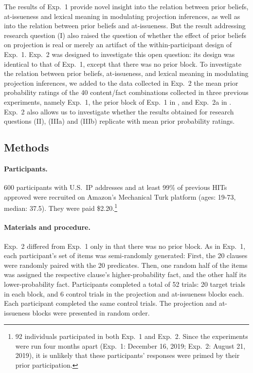 \documentclass[11pt,fleqn]{article}
\newcommand{\6}{\mbox{$[\hspace*{-.6mm}[$}}
\newcommand{\9}{\mbox{$]\hspace*{-.6mm}]$}}
\begin{document}
The results of Exp.~1 provide novel insight into the relation between prior beliefs, at-issueness and lexical meaning in modulating projection inferences, as well as into the relation between prior beliefs and at-issueness. But the result addressing research question (I) also raised the question of whether the effect of prior beliefs on projection is real or merely an artifact of the within-participant design of Exp.~1. Exp.~2 was designed to investigate this open question: its design was identical to that of Exp.~1, except that there was no prior block. To investigate the relation between prior beliefs, at-issueness, and lexical meaning in modulating projection inferences, we added to the data collected in Exp.~2 the mean prior probability ratings of the 40 content/fact combinations collected in three previous experiments, namely Exp.~1, the prior block of Exp.~1 in \cite{degen-tonhauser-openmind}, and Exp.~2a in \cite{degen-tonhauser-openmind}. Exp.~2 also allows us to investigate whether the results obtained for research questions (II), (IIIa) and (IIIb) replicate with mean prior probability ratings.

\subsection{Methods}

\paragraph{Participants.} 600 participants with U.S.\ IP addresses and at least 99\% of previous HITs approved were recruited on Amazon's Mechanical Turk platform (ages: 19-73, median: 37.5). They were paid \$2.20.\footnote{92 individuals participated in both Exp.~1 and Exp.~2. Since the experiments were run four months apart (Exp.~1: December 16, 2019; Exp.~2: August 21, 2019), it is unlikely that these participants' responses were primed by their prior participation.}

\paragraph{Materials and procedure.}  Exp.~2 differed from Exp.~1 only in that there was no prior block. As in Exp.~1, each participant's set of items was semi-randomly generated: First, the 20 clauses were randomly paired with the 20 predicates. Then, one random half of the items was assigned the respective clause's higher-probability fact, and the other half its lower-probability fact. Participants completed a total of 52 trials: 20 target trials in each block, and 6 control trials in the projection and at-issueness blocks each. Each participant completed the same control trials. The projection and at-issueness blocks were presented in random order. 
\end{document}
